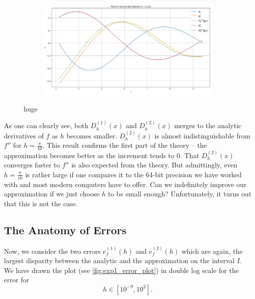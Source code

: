 \begin{figure}[h!]
\begin{subfigure}[b]{0.49\linewidth}
    \end{subfigure}
    \begin{subfigure}[b]{0.49\linewidth}
        \includegraphics[width=\linewidth]{graphics/plot_h/exp1_tiny_h.png}
    \end{subfigure}
    \caption{huge}
    \label{fig:exp1_h}
\end{figure}

As one can clearly see, both \(D^{(1)}_h(x)\) and \(D^{(2)}_h(x)\) merges to the analytic derivatives of \(f\) as \(h\) becomes smaller. \(D^{(2)}_h(x)\) is almost indistinguishable from \(f''\) for \(h = \frac{\pi}{10}\). This result confirms the first part of the theory -- the approximation becomes better as the increment tends to \(0\). That \(D^{(2)}_h(x)\) converges faster to \(f''\) is also expected from the theory. But admittingly, even \(h = \frac{\pi}{10}\) is rather large if one compares it to the 64-bit precision we have worked with and most modern computers have to offer. Can we indefinitely improve our approximation if we just choose \(h\) to be small enough? Unfortunately, it turns out that this is not the case.

\subsection{The Anatomy of Errors}

Now, we consider the two errors \(e_f^{(1)}(h)\) and \(e_f^{(2)}(h)\) which are again, the largest disparity between the analytic and the approximation on the interval \(I\). We have drawn the plot (see \ref{fig:exp1_error_plot}) in double log scale for the error for
\[h \in [10^{-9}, 10^2] \text{.} \]

